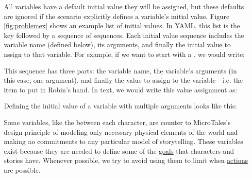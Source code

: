 \documentclass{nilreport}
\begin{document}
All variables have a default initial value they will be assigned, but these defaults are ignored if the scenario explicitly defines a variable's initial value. Figure \ref{fig:problemex} shows an example list of initial values. In YAML, this list is the key  followed by a sequence of sequences. Each initial value sequence includes the variable name (defined below), its arguments, and finally the initial value to assign to that variable. For example, if we want  to start with a , we would write:

\centerline{}

\noindent This sequence has three parts: the variable name, the variable's arguments (in this case, one argument), and finally the value to assign to the variable---i.e. the item to put in Robin's  hand. In text, we would write this value assignment as:

\centerline{}

\noindent Defining the initial value of a variable with multiple arguments looks like this:

\centerline{}

Some variables, like the  between each character, are counter to MicroTales's design principle of modeling only necessary physical elements of the world and making no commitments to any particular model of storytelling. These variables exist because they are needed to define some of the \hyperref[sec:goals]{goals} that characters and stories have. Whenever possible, we try to avoid using them to limit when \hyperref[sec:actions]{actions} are possible.

\end{document}
